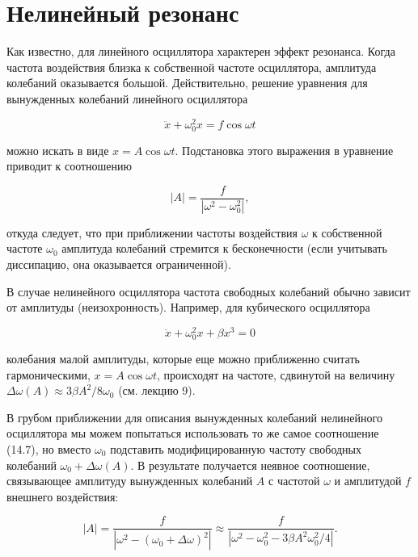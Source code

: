\documentclass[10pt]{article}
\begin{document}
\section*{Нелинейный резонанс}
Как известно, для линейного осциллятора характерен эффект резонанса. Когда частота воздействия близка к собственной частоте осциллятора, амплитуда колебаний оказывается большой. Действительно, решение уравнения для вынужденных колебаний линейного осциллятора


\begin{equation*}
\ddot{x}+\omega_{0}^{2} x=f \cos \omega t \tag{14.6}
\end{equation*}


можно искать в виде $x=A \cos \omega t$. Подстановка этого выражения в уравнение приводит к соотношению


\begin{equation*}
|A|=\frac{f}{\left|\omega^{2}-\omega_{0}^{2}\right|}, \tag{14.7}
\end{equation*}


откуда следует, что при приближении частоты воздействия $\omega$ к собственной частоте $\omega_{0}$ амплитуда колебаний стремится к бесконечности (если учитывать диссипацию, она оказывается ограниченной).

В случае нелинейного осциллятора частота свободных колебаний обычно зависит от амплитуды (неизохронность). Например, для кубического осциллятора


\begin{equation*}
\ddot{x}+\omega_{0}^{2} x+\beta x^{3}=0 \tag{14.8}
\end{equation*}


колебания малой амплитуды, которые еще можно приближенно считать гармоническими, $x=A \cos \omega t$, происходят на частоте, сдвинутой на величину $\Delta \omega(A) \approx 3 \beta A^{2} / 8 \omega_{0}$ (см. лекцию 9).

В грубом приближении для описания вынужденных колебаний нелинейного осциллятора мы можем попытаться использовать то же самое соотношение (14.7), но вместо $\omega_{0}$ подставить модифицированную частоту свободных колебаний $\omega_{0}+\Delta \omega(A)$. В результате получается неявное соотношение, связывающее амплитуду вынужденных колебаний $A$ с частотой $\omega$ и амплитудой $f$ внешнего воздействия:


\begin{equation*}
|A|=\frac{f}{\left|\omega^{2}-\left(\omega_{0}+\Delta \omega\right)^{2}\right|} \approx \frac{f}{\left|\omega^{2}-\omega_{0}^{2}-3 \beta A^{2} \omega_{0}^{2} / 4\right|} . \tag{14.9}
\end{equation*}
\end{document}
